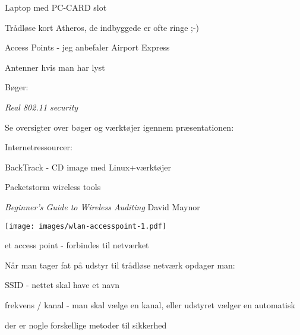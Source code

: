 \documentclass[Screen16to9,17pt]{foils}
\begin{document}

\begin{list1}
\item Laptop med PC-CARD slot
\item Trådløse kort Atheros, de indbyggede er ofte ringe ;-)
\item Access Points - jeg anbefaler Airport Express
\item Antenner hvis man har lyst
\item Bøger:
\begin{list2}
\item \emph{Real 802.11 security}
\item Se oversigter over bøger og værktøjer igennem præsentationen:
\end{list2}
\item Internetressourcer:
\begin{list2}
\item BackTrack - CD image med Linux+værktøjer
\item Packetstorm wireless tools
\item \emph{Beginner's Guide to Wireless Auditing}
David Maynor
\end{list2}
\end{list1}



\begin{center}
\colorbox{white}{\texttt{[image: images/wlan-accesspoint-1.pdf]}}
\end{center}

\centerline{\hlkbig et access point - forbindes til netværket}


\begin{list1}
\item Når man tager fat på udstyr til trådløse netværk opdager man:
\item SSID - nettet skal have et navn
\item frekvens / kanal - man skal vælge en kanal, eller udstyret
  vælger en automatisk
\item der er nogle forskellige metoder til sikkerhed
\end{list1}


\end{document}
